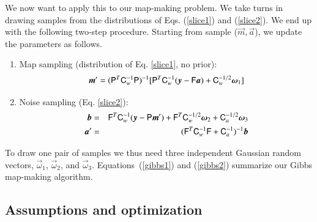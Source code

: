 \documentclass[twocolumn]{aa}
\newcommand{\ve}[1]{{\vec #1}}
\newcommand{\ma}[1]{\tens{#1}}
\begin{document}
We now want to apply this to our map-making problem.
We take turns in drawing samples from the
distributions of Eqs. (\ref{slice1}) and (\ref{slice2}).
We end up with the
following two-step procedure.
Starting from sample ($\ve m,\ve a$), we update the parameters as follows.
\begin{enumerate}
\item Map sampling (distribution of Eq. \ref{slice1}, no prior):
%
\begin{equation}
\ve m' = (\ma P^T \ma C_w^{-1}\ma P)^{-1} [\ma P^T \ma C_w^{-1} (\ve y-\ma F\ve a) 
+ \ma C_w^{-1/2}\ve\omega_1] \label{gibbs1}
\end{equation} 
%

\item Noise sampling (Eq. \ref{slice2}):
%
\begin{eqnarray}
\ve b &=&  \ma F^T \ma C_w^{-1} (\ve y -\ma P\ve m')
        +\ma F^T\ma C_w^{-1/2}\ve\omega_2 
        +\ma C_a^{-1/2}\ve\omega_3   \nonumber \\
\ve a' &=& (\ma F^T \ma C_w^{-1}\ma F +\ma C_a^{-1})^{-1} \ve b \label{gibbs2}
\end{eqnarray}
\end{enumerate}
%
To draw one pair of samples we thus need three independent Gaussian random vectors, 
$\ve \omega_1$, $\ve \omega_2$, and $\ve \omega_3$. Equations~(\ref{gibbs1}) and (\ref{gibbs2})
summarize our Gibbs map-making algorithm.


\subsection{Assumptions and optimization}
\end{document}
